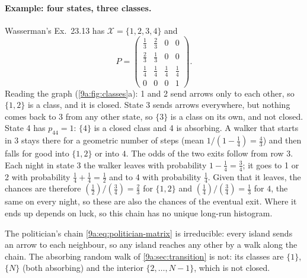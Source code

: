 \paragraph{Example: four states, three classes.}
Wasserman's Ex.~23.13 has $\mathcal X=\{1,2,3,4\}$ and
\begin{equation*}
  P=\begin{pmatrix}
    \tfrac13&\tfrac23&0&0\\[1pt]
    \tfrac23&\tfrac13&0&0\\[1pt]
    \tfrac14&\tfrac14&\tfrac14&\tfrac14\\[1pt]
    0&0&0&1
  \end{pmatrix}.
\end{equation*}
Reading the graph (\cref{9a:fig:classes}a): 1 and 2 send arrows only to each other, so
$\{1,2\}$ is a class, and it is closed. State 3 sends arrows everywhere, but nothing comes back
to 3 from any other state, so $\{3\}$ is a class on its own, and not closed. State 4 has
$p_{44}=1$: $\{4\}$ is a closed class and 4 is absorbing. A walker that starts in 3 stays
there for a geometric number of steps (mean $1/(1-\tfrac14)=\tfrac43$) and then falls for good
into $\{1,2\}$ or into $4$. The odds of the two exits follow from row 3. Each night in state 3
the walker leaves with probability $1-\tfrac14=\tfrac34$; it goes to 1 or 2 with probability
$\tfrac14+\tfrac14=\tfrac12$ and to 4 with probability $\tfrac14$. Given that it leaves, the
chances are therefore $(\tfrac12)/(\tfrac34)=\tfrac23$ for $\{1,2\}$ and
$(\tfrac14)/(\tfrac34)=\tfrac13$ for $4$, the same on every night, so these are also the
chances of the eventual exit. Where it ends up depends on luck, so this chain has no unique
long-run histogram.

The politician's chain \eqref{9a:eq:politician-matrix} is irreducible: every island sends an
arrow to each neighbour, so any island reaches any other by a walk along the chain. The
absorbing random walk of \cref{9a:sec:transition} is not: its classes are $\{1\}$, $\{N\}$
(both absorbing) and the interior $\{2,\dots,N-1\}$, which is not closed.

